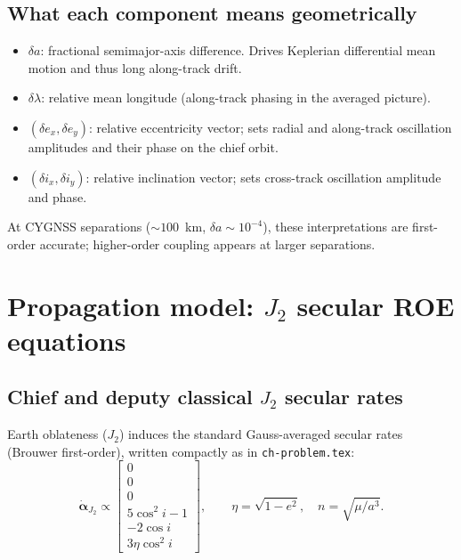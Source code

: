 \documentclass[11pt]{article}
\begin{document}
\subsection{What each component means geometrically}

\begin{itemize}
    \item $\delta a$: fractional semimajor-axis difference. Drives Keplerian differential mean motion and thus long along-track drift.
    \item $\delta\lambda$: relative mean longitude (along-track phasing in the averaged picture).
    \item $(\delta e_x,\delta e_y)$: relative eccentricity vector; sets radial and along-track oscillation amplitudes and their phase on the chief orbit.
    \item $(\delta i_x,\delta i_y)$: relative inclination vector; sets cross-track oscillation amplitude and phase.
\end{itemize}

At CYGNSS separations ($\sim 100$~km, $\delta a \sim 10^{-4}$), these interpretations are first-order accurate; higher-order coupling appears at larger separations.

\section{Propagation model: $J_2$ secular ROE equations}

\subsection{Chief and deputy classical $J_2$ secular rates}

Earth oblateness ($J_2$) induces the standard Gauss-averaged secular rates (Brouwer first-order), written compactly as in \texttt{ch-problem.tex}:
\begin{equation}
\dot{\bm{\alpha}}_{J_2} \propto
\begin{bmatrix} 0 \\ 0 \\ 0 \\ 5\cos^2 i - 1 \\ -2\cos i \\ 3\eta\cos^2 i \end{bmatrix},
\qquad \eta = \sqrt{1-e^2},\quad n = \sqrt{\mu/a^3}.
\end{equation}
\end{document}
